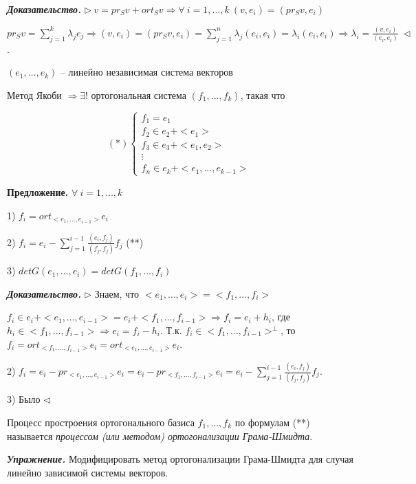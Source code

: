 \bigskip
\textbf{\textit{Доказательство.}} $\rhd \ v = pr_S v + ort_S v \Rightarrow \forall \ i = 1, \dots, k \ (v, e_i) = (pr_S v, e_i)$

$pr_S v = \sum\limits_{j = 1}^k \lambda_j e_j \Rightarrow (v, e_i) = (pr_S v, e_i) = \sum\limits_{j = 1}^n \lambda_j (e_i, e_i) = \lambda_i (e_i, e_i) \Rightarrow \lambda_i = \frac{(v, e_i)}{(e_i, e_i)} \ \lhd$.

\bigskip
$(e_1, \dots, e_k)$  -- линейно независимая система векторов

Метод Якоби $\Rightarrow \exists!$ ортогональная система $(f_1, \dots, f_k)$, такая что

\begin{equation*}
(*) \begin{cases}
		f_1 = e_1 \\
		f_2 \in e_2 + <e_1> \\
        f_3 \in e_3 + <e_1, e_2> \\
        \vdots \\
        f_n \in e_k + <e_1, \dots, e_{k-1}>
	\end{cases}
\end{equation*}  

\bigskip
\textbf{Предложение.} $\forall \ i = 1, \dots, k$

1) $f_i = ort_{<e_1, \dots, e_{i-1}>} e_i$

2) $f_i = e_i - \sum\limits_{j=1}^{i-1} \frac{(e_i, f_j)}{(f_j, f_j)} f_j$ (**)

3) $det G(e_1, \dots, e_i) = det G(f_1, \dots, f_i)$

\bigskip
\textbf{\textit{Доказательство.}} $\rhd$ Знаем, что $<e_1, \dots, e_i> = <f_1, \dots, f_i>$

$f_i \in e_i + <e_1, \dots, e_{i-1}> = e_i + <f_1, \dots, f_{i-1}> \Rightarrow f_i = e_i + h_i$, где $h_i \in <f_1, \dots, f_{i-1}> \Rightarrow e_i = f_i - h_i$. Т.к. $f_i \in <f_1, \dots, f_{i-1}>^{\bot}$, то $f_i = ort_{<f_1, \dots, f_{i-1}>} e_i = ort_{<e_1, \dots, e_{i-1}>} e_i$.

2) $f_i = e_i - pr_{<e_1, \dots, e_{i-1}>} e_i = e_i - pr_{<f_1, \dots, f_{i-1}>} e_i = e_i - \sum\limits_{j=1}^{i-1} \frac{(e_i, f_j)}{(f_j, f_j)} f_j$.

3) Было $\lhd$

\bigskip
Процесс простроения ортогонального базиса $f_1, \dots, f_k$ по формулам (**) называется \textit{процессом (или методом) ортогонализации Грама-Шмидта}.

\bigskip
\textbf{\textit{Упражнение.}} Модифицировать метод ортогонализации Грама-Шмидта для случая линейно зависимой системы векторов.

